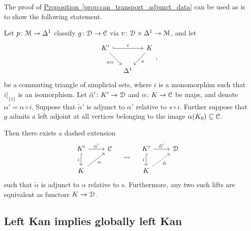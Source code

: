 \documentclass[main.tex]{subfiles}
\begin{document}
The proof of \hyperref[prop:can_transport_adjunct_data]{Proposition~\ref*{prop:can_transport_adjunct_data}} can be used as is to show the following statement.

\begin{proposition}
  \label{prop:can_transport_adjunct_data_partial}
  Let $p\colon \mathcal{M} \to \Delta^{1}$ classify $g\colon \mathcal{D} \to \mathcal{C}$ via $v\colon \mathcal{D} \times\Delta^{1} \to \mathcal{M}$, and let
  \begin{equation*}
    \begin{tikzcd}[column sep=small]
      K'
      \arrow[rr, hook, "i"]
      \arrow[dr, swap, "s \circ i"]
      && K
      \arrow[dl, "s"]
      \\
      & \Delta^{1}
    \end{tikzcd},
  \end{equation*}
  be a commuting triangle of simplicial sets, where $i$ is a monomorphim such that $i|_{\{1\}}$ is an isomorphism. Let $\tilde{\alpha}'\colon K' \to \mathcal{D}$ and $\alpha\colon K \to \mathcal{C}$ be maps, and denote $\alpha' = \alpha \circ i$. Suppose that $\tilde{\alpha}'$ is adjunct to $\alpha'$ relative to $s \circ i$. Further suppose that $g$ admits a left adjoint at all vertices belonging to the image $\alpha(K_{0}) \subseteq \mathcal{C}$.

  Then there exists a dashed extension
  \begin{equation}
    \label{eq:adjunct_filling_problems_partial}
    \begin{tikzcd}
      K'
      \arrow[r, "\alpha'"]
      \arrow[d, swap, hook, "i"]
      & \category{C}
      \\
      K
      \arrow[ur, swap, "\alpha"]
    \end{tikzcd}
    \quad \rightsquigarrow \quad
    \begin{tikzcd}
      K'
      \arrow[r, "\tilde{\alpha}'"]
      \arrow[d, swap, hook, "i"]
      & \category{D}
      \\
      K
      \arrow[ur, dashed, swap, "\tilde{\alpha}"]
    \end{tikzcd}
  \end{equation}
  such that $\tilde{\alpha}$ is adjunct to $\alpha$ relative to $s$. Furthermore, any two such lifts are equivalent as functors $K \to \mathcal{D}$.
\end{proposition}


\subsection{Left Kan implies globally left Kan}
\label{ssc:left_kan_implies_globally_left_kan}
\end{document}
